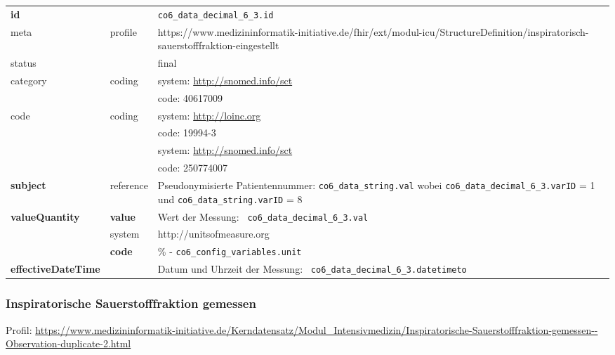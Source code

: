 \begin{longtable}{|l|l|p{7.5cm}|}
	\hline
	\rowcolor{lightgray} \multicolumn{3}{|l|}{Data Mapping (inhaltlich)} \\ \hline
	\textbf{id} &  & \texttt{co6\_data\_decimal\_6\_3.id} \\ \hline
	meta & profile & https://www.medizininformatik-initiative.de/fhir/ext/modul-icu/StructureDefinition/inspiratorisch-sauerstofffraktion-eingestellt \\ \hline 
	status &  & final   \\ \hline 
	category & coding & system: \url{http://snomed.info/sct} \\
	\cline{3-3}
	& & code: 40617009 \\ \hline
	code & coding & system: \url{http://loinc.org} \\ 
	\cline{3-3} 
	&  & code: 19994-3 \\ 
	\cline{3-3} 
	&  & system: \url{http://snomed.info/sct} \\ 
	\cline{3-3} 
	&  & code: 250774007  \\ \hline
	\textbf{subject} & reference & Pseudonymisierte Patientennummer: \texttt{co6\_data\_string.val} wobei \texttt{co6\_data\_decimal\_6\_3.varID} = 1 und \texttt{co6\_data\_string.varID} = 8 \\ \hline
	\textbf{valueQuantity}  & \textbf{value} & Wert der Messung: \texttt{
		co6\_data\_decimal\_6\_3.val} \\
	\cline{2-3}
	& system & http://unitsofmeasure.org \\
	\cline{2-3}
	& \textbf{code} & \% - \texttt{co6\_config\_variables.unit}
	\\ \hline
	\textbf{effectiveDateTime}  & & Datum und Uhrzeit der Messung: \texttt{
		co6\_data\_decimal\_6\_3.datetimeto} \\
	\hline
\end{longtable}

\subsubsection{Inspiratorische Sauerstofffraktion gemessen} 

Profil: \url{https://www.medizininformatik-initiative.de/Kerndatensatz/Modul_Intensivmedizin/Inspiratorische-Sauerstofffraktion-gemessen--Observation-duplicate-2.html}


